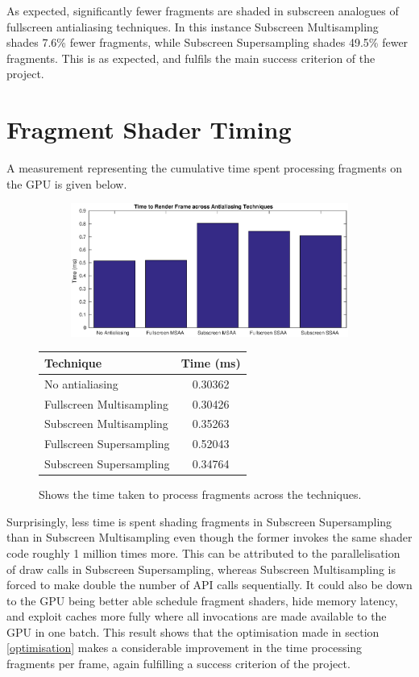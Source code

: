 \documentclass[12pt,a4paper,twoside,openright]{report}
\begin{document}
As expected, significantly fewer fragments are shaded in subscreen analogues of fullscreen antialiasing techniques. In this instance Subscreen Multisampling shades 7.6\% fewer fragments, while Subscreen Supersampling shades 49.5\% fewer fragments. This is as expected, and fulfils the main success criterion of the project.

\clearpage

\section{Fragment Shader Timing}

A measurement representing the cumulative time spent processing fragments on the GPU is given below.

\begin{figure}[tbh]

 
\begin{subfigure}{0.5\textwidth}
\includegraphics[width=1.2\linewidth]{figs/timeToRenderFrame.eps}
\end{subfigure}
\qquad
\begin{tabular}{l|c}
Technique   & Time (ms) \\ 
\hline
No antialiasing      & 0.30362 \\
Fullscreen Multisampling     & 0.30426 \\
Subscreen Multisampling    &  0.35263  \\
Fullscreen Supersampling      &  0.52043   \\
Subscreen Supersampling    &  0.34764  \\
\end{tabular}
 
\caption{Shows the time taken to process fragments across the techniques.}
\end{figure}

Surprisingly, less time is spent shading fragments in Subscreen Supersampling than in Subscreen Multisampling even though the former invokes the same shader code roughly 1 million times more. This can be attributed to the parallelisation of draw calls in Subscreen Supersampling, whereas Subscreen Multisampling is forced to make double the number of API calls sequentially. It could also be down to the GPU being better able schedule fragment shaders, hide memory latency, and exploit caches more fully where all invocations are made available to the GPU in one batch. This result shows that the optimisation made in section \ref{optimisation} makes a considerable improvement in the time processing fragments per frame, again fulfilling a success criterion of the project. \\
\end{document}
